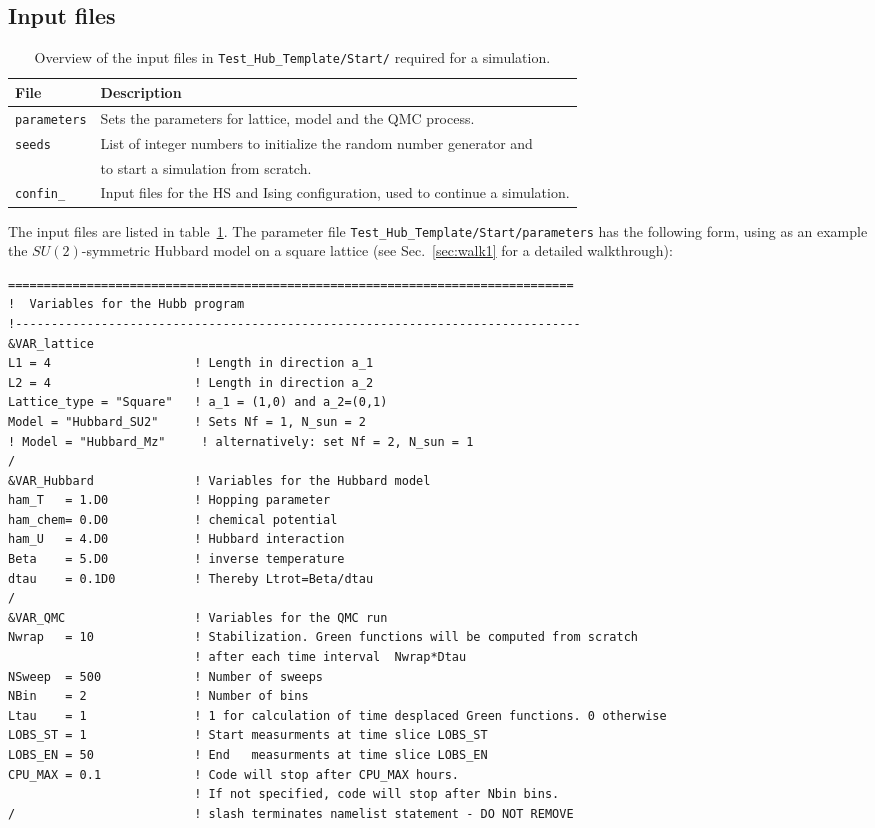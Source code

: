 \subsection{Input files}\label{sec:input}
%
\begin{table}[h]
   \begin{tabular}{l l}
   File & Description \\\hline
  \texttt{parameters} &  Sets the parameters for lattice, model and the QMC process.\\
  \texttt{seeds} & List of integer numbers to initialize the random number generator and \\
   & to start a simulation from scratch.\\
  \texttt{confin\_<thread number>} & Input files for the HS and Ising configuration, used to continue a simulation. 
   \end{tabular}
   \caption{Overview of the input files in \texttt{Test\_Hub\_Template/Start/} required for a simulation. \label{table:input}}
\end{table}
%
The input files are listed in table~\ref{table:input}. 
The parameter file \texttt{Test\_Hub\_Template/Start/parameters} has the following form, 
using as an example  the $SU(2)$-symmetric Hubbard model on a square lattice (see Sec.~\ref{sec:walk1} for a detailed walkthrough):
%
\begin{lstlisting} 
===============================================================================
!  Variables for the Hubb program
!-------------------------------------------------------------------------------
&VAR_lattice
L1 = 4                    ! Length in direction a_1
L2 = 4                    ! Length in direction a_2
Lattice_type = "Square"	  ! a_1 = (1,0) and a_2=(0,1)
Model = "Hubbard_SU2"     ! Sets Nf = 1, N_sun = 2
! Model = "Hubbard_Mz"     ! alternatively: set Nf = 2, N_sun = 1
/
&VAR_Hubbard              ! Variables for the Hubbard model
ham_T   = 1.D0            ! Hopping parameter
ham_chem= 0.D0            ! chemical potential
ham_U   = 4.D0            ! Hubbard interaction
Beta    = 5.D0            ! inverse temperature
dtau    = 0.1D0           ! Thereby Ltrot=Beta/dtau
/
&VAR_QMC                  ! Variables for the QMC run
Nwrap   = 10              ! Stabilization. Green functions will be computed from scratch 
                          ! after each time interval  Nwrap*Dtau
NSweep  = 500             ! Number of sweeps
NBin    = 2               ! Number of bins
Ltau    = 1               ! 1 for calculation of time desplaced Green functions. 0 otherwise
LOBS_ST = 1               ! Start measurments at time slice LOBS_ST
LOBS_EN = 50              ! End   measurments at time slice LOBS_EN
CPU_MAX = 0.1             ! Code will stop after CPU_MAX hours. 
                          ! If not specified, code will stop after Nbin bins.
/                         ! slash terminates namelist statement - DO NOT REMOVE
\end{lstlisting}
%

